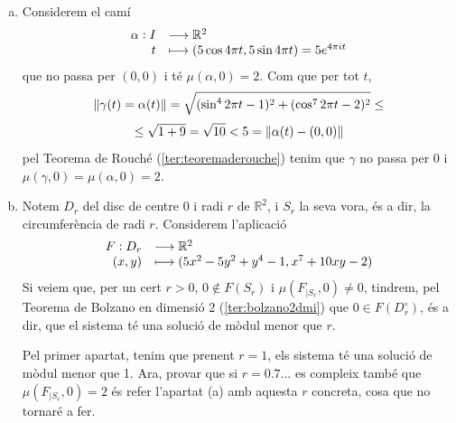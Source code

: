 \documentclass[../main.tex]{subfiles}
\begin{document}
\begin{sol}
\begin{enumerate}[(a)]
    \item Considerem el camí 
    \begin{equation}
        \notag
        \begin{array}{rl}
            \alpha:I & \longrightarrow\mathbb{R}^2 \\
            t & \longmapsto (5\cos 4\pi t,5\sin 4\pi t) = 5e^{4\pi it}
        \end{array}
    \end{equation}
    que no passa per $(0,0)$ i té $\mu(\alpha,0)=2$. Com que per tot $t$,
    \begin{equation}
        \notag
        \|\gamma(t) = \alpha(t)\|= \sqrt{(\sin^4 2\pi t-1)^2+(\cos^72\pi t-2)^2}\leq
    \end{equation}
    \begin{equation}
        \notag
        \leq \sqrt{1+9}=\sqrt{10}<5 = \|\alpha(t)-(0,0)\|
    \end{equation}
    pel Teorema de Rouché (\ref{ter:teoremaderouche}) tenim que $\gamma$ no passa per 0 i $\mu(\gamma,0) = \mu(\alpha,0)=2$.
    
    \item Notem $D_r$ del disc de centre 0 i radi $r$ de $\mathbb{R}^2$, i $S_r$ la seva vora, és a dir, la circumferència de radi $r$. Considerem l'aplicació
    \begin{equation}
        \notag
        \begin{array}{rl}
            F:D_r & \longrightarrow \mathbb{R}^2 \\
            (x,y) & \longmapsto (5x^2-5y^2+y^4-1,x^7+10xy-2)
        \end{array}
    \end{equation}
    Si veiem que, per un cert $r>0$, $0\not\in F(S_r)$ i $\mu(F_{|S_r},0)\not=0$, tindrem, pel Teorema de Bolzano en dimensió 2 (\ref{ter:bolzano2dmi}) que $0\in F(D_r^\circ)$, és a dir, que el sistema té una solució de mòdul menor que $r$.
    
    Pel primer apartat, tenim que prenent $r=1$, els sistema té una solució de mòdul menor que 1. Ara, provar que si $r = 0.7\ldots$ es compleix també que $\mu(F_{|S_r},0)=2$ és refer l'apartat (a) amb aquesta $r$ concreta, cosa que no tornaré a fer.
\end{enumerate}
\end{sol}
    
    
    
\end{document}
